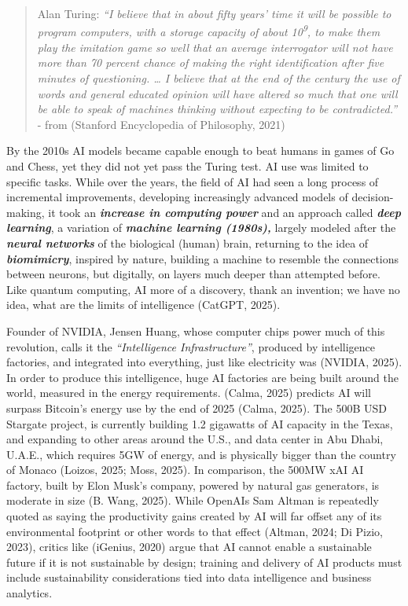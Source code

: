 \documentclass[
  12pt,
  letterpaper,
  DIV=11,
  numbers=noendperiod]{scrartcl}
\begin{document}
\begin{quote}
Alan Turing: \emph{``I believe that in about fifty years' time it will
be possible to program computers, with a storage capacity of about
10\textsuperscript{9}, to make them play the imitation game so well that
an average interrogator will not have more than 70 percent chance of
making the right identification after five minutes of questioning.
\ldots{} I believe that at the end of the century the use of words and
general educated opinion will have altered so much that one will be able
to speak of machines thinking without expecting to be contradicted.''} -
from (Stanford Encyclopedia of Philosophy, 2021)
\end{quote}

By the 2010s AI models became capable enough to beat humans in games of
Go and Chess, yet they did not yet pass the Turing test. AI use was
limited to specific tasks. While over the years, the field of AI had
seen a long process of incremental improvements, developing increasingly
advanced models of decision-making, it took an \textbf{\emph{increase in
computing power}} and an approach called \textbf{\emph{deep learning}},
a variation of \textbf{\emph{machine learning (1980s),}} largely modeled
after the \textbf{\emph{neural networks}} of the biological (human)
brain, returning to the idea of \textbf{\emph{biomimicry}}, inspired by
nature, building a machine to resemble the connections between neurons,
but digitally, on layers much deeper than attempted before. Like quantum
computing, AI more of a discovery, thank an invention; we have no idea,
what are the limits of intelligence (CatGPT, 2025).

Founder of NVIDIA, Jensen Huang, whose computer chips power much of this
revolution, calls it the \emph{``Intelligence Infrastructure''},
produced by intelligence factories, and integrated into everything, just
like electricity was (NVIDIA, 2025). In order to produce this
intelligence, huge AI factories are being built around the world,
measured in the energy requirements. (Calma, 2025) predicts AI will
surpass Bitcoin's energy use by the end of 2025 (Calma, 2025). The 500B
USD Stargate project, is currently building 1.2 gigawatts of AI capacity
in the Texas, and expanding to other areas around the U.S., and data
center in Abu Dhabi, U.A.E., which requires 5GW of energy, and is
physically bigger than the country of Monaco (Loizos, 2025; Moss, 2025).
In comparison, the 500MW xAI AI factory, built by Elon Musk's company,
powered by natural gas generators, is moderate in size (B. Wang, 2025).
While OpenAIs Sam Altman is repeatedly quoted as saying the productivity
gains created by AI will far offset any of its environmental footprint
or other words to that effect (Altman, 2024; Di Pizio, 2023), critics
like (iGenius, 2020) argue that AI cannot enable a sustainable future if
it is not sustainable by design; training and delivery of AI products
must include sustainability considerations tied into data intelligence
and business analytics.
\end{document}
